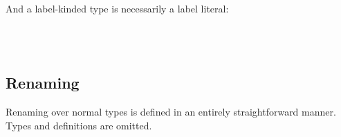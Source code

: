 \documentclass[authoryear, acmsmall, screen, review, nonacm]{acmart}
\begin{document}
\begin{code}
\\
\>[0]\AgdaSpace{}%
\AgdaSymbol{(}\AgdaSpace{}%
\AgdaSpace{}%
\AgdaSymbol{)}\AgdaSpace{}%
\AgdaSymbol{=}\AgdaSpace{}%
\AgdaSpace{}%
\AgdaSymbol{(}\AgdaSpace{}%
\AgdaSymbol{)}\<%
\\
\>[0]\AgdaSpace{}%
\AgdaSymbol{((}\AgdaSpace{}%
\AgdaOperator{\AgdaInductiveConstructor{<\$>}}\AgdaSpace{}%
\AgdaSymbol{))}\AgdaSpace{}%
\AgdaSymbol{=}\AgdaSpace{}%
\AgdaSpace{}%
\AgdaSymbol{(}\AgdaSpace{}%
\AgdaSymbol{)}\<%
\end{code}

\Ni And a label-kinded type is necessarily a label literal:

\begin{code}%
\>[0]\AgdaSpace{}%
\AgdaSymbol{:}\AgdaSpace{}%
\AgdaSpace{}%
\AgdaSymbol{(}\AgdaSpace{}%
\AgdaSymbol{:}\AgdaSpace{}%
\AgdaSpace{}%
\AgdaSpace{}%
\AgdaSymbol{)}\AgdaSpace{}%
\AgdaSpace{}%
\AgdaFunction{∃[}\AgdaSpace{}%
\AgdaSpace{}%
\AgdaFunction{]}\AgdaSpace{}%
\AgdaSymbol{(}\AgdaSpace{}%
\AgdaSpace{}%
\AgdaSpace{}%
\AgdaSymbol{)}\<%
\\
\>[0]\AgdaSpace{}%
\AgdaSymbol{(}\AgdaSpace{}%
\AgdaSymbol{)}\AgdaSpace{}%
\AgdaSymbol{=}\AgdaSpace{}%
\AgdaSpace{}%
\AgdaSymbol{(}\AgdaSpace{}%
\AgdaSymbol{)}\<%
\\
\>[0]\AgdaSpace{}%
\AgdaSymbol{(}\AgdaSpace{}%
\AgdaSymbol{)}\AgdaSpace{}%
\AgdaSymbol{=}\AgdaSpace{}%
\AgdaSpace{}%
\AgdaOperator{\AgdaInductiveConstructor{,}}\AgdaSpace{}%
\<%
\end{code}

\subsection{Renaming}

Renaming over normal types is defined in an entirely straightforward manner. Types and definitions are omitted.
\end{document}
